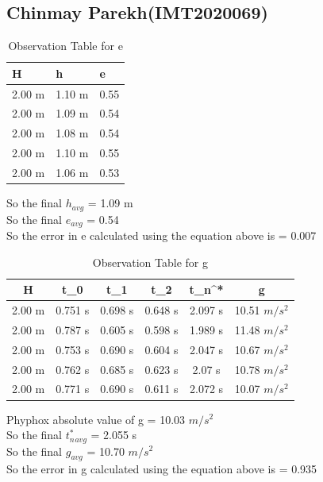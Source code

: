 \documentclass[11pt]{scrartcl} %
\begin{document}
\newpage
\subsection{Chinmay Parekh(IMT2020069)}

\begin{table}[h] %
	\centering %
	\begin{tabular}{l l l}
		\toprule
		\textbf{H} & \textbf{h} & \textbf{e} \\
		\midrule
		2.00 m & 1.10 m & 0.55\\
        2.00 m & 1.09 m  & 0.54\\
        2.00 m & 1.08 m  & 0.54\\
        2.00 m & 1.10 m & 0.55 \\
        2.00 m & 1.06 m & 0.53 \\
		\bottomrule
	\end{tabular}
	\caption{Observation Table for e}
\end{table}
So the final $h_{avg}$ = 1.09 m\\
So the final $e_{avg}$ = 0.54\\
So the error in e calculated using the equation above is  = 0.007
\begin{table}[h]
\centering
\begin{tabular}{||c c c c c c||} 
\toprule
 \hline
 H & t_0 & t_1 & t_2 & t_n^* & g \\ [0.5ex] 
 \midrule
 \hline\hline
 2.00 m & 0.751 s & 0.698 s  & 0.648 s & 2.097 s & 10.51 $m/s^2$  \\ 
 \hline
 2.00 m & 0.787 s & 0.605 s & 0.598 s & 1.989 s & 11.48 $m/s^2$  \\
 \hline
 2.00 m & 0.753 s & 0.690 s & 0.604 s & 2.047 s  & 10.67 $m/s^2$   \\
 \hline
 2.00 m & 0.762 s & 0.685 s & 0.623 s & 2.07 s  & 10.78 $m/s^2$   \\
 \hline
 2.00 m & 0.771 s & 0.690 s & 0.611 s & 2.072 s  & 10.07 $m/s^2$  \\ [1ex]
 \bottomrule
 \hline
\end{tabular}
\caption{Observation Table for g}
\end{table}
Phyphox absolute value of g = 10.03 $m/s^2$\\
So the final $t_n^*_{avg}$ = 2.055 s\\
So the final $g_{avg}$ = 10.70 $m/s^2$\\
So the error in g calculated using the equation above is  = 0.935 \\
\end{document}
